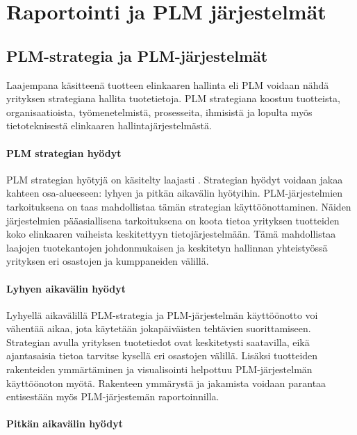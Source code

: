 \chapter{Raportointi ja PLM järjestelmät} \label{Raportointi ja PLM järjestelmät}

\section{PLM-strategia ja PLM-järjestelmät} \label{PLM-järjestelmät}

Laajempana käsitteenä tuotteen elinkaaren hallinta eli PLM voidaan nähdä yrityksen strategiana hallita tuotetietoja. PLM strategiana koostuu tuotteista, organisaatioista, työmenetelmistä, prosesseita, ihmisistä ja lopulta myös tietoteknisestä elinkaaren hallintajärjestelmästä. \cite{alemanni_key_2008}

\subsubsection{PLM strategian hyödyt} \label{PLM strategian hyödyt}

PLM strategian hyötyjä on käsitelty laajasti \cite{alemanni_key_2008} \cite{rivest_product_2012}. Strategian hyödyt voidaan jakaa kahteen osa-alueeseen: lyhyen ja pitkän aikavälin hyötyihin. PLM-järjestelmien tarkoituksena on taas mahdollistaa tämän strategian käyttöönottaminen. Näiden järjestelmien pääasiallisena tarkoituksena on koota tietoa yrityksen tuotteiden koko elinkaaren vaiheista keskitettyyn tietojärjestelmään. Tämä mahdollistaa laajojen tuotekantojen johdonmukaisen ja keskitetyn hallinnan yhteistyössä yrityksen eri osastojen ja kumppaneiden välillä.

\subsubsection{Lyhyen aikavälin hyödyt} \label{Lyhyen aikavälin hyödyt}

Lyhyellä aikavälillä PLM-strategia ja PLM-järjestelmän käyttöönotto voi vähentää aikaa, jota käytetään jokapäiväisten tehtävien suorittamiseen. Strategian avulla yrityksen tuotetiedot ovat keskitetysti saatavilla, eikä ajantasaisia tietoa tarvitse kysellä eri osastojen välillä. Lisäksi tuotteiden rakenteiden ymmärtäminen ja visualisointi helpottuu PLM-järjestelmän käyttöönoton myötä. Rakenteen ymmärystä ja jakamista voidaan parantaa entisestään myös PLM-järjestemän raportoinnilla.

\subsubsection{Pitkän aikavälin hyödyt} \label{Pitkän aikavälin hyödyt}


